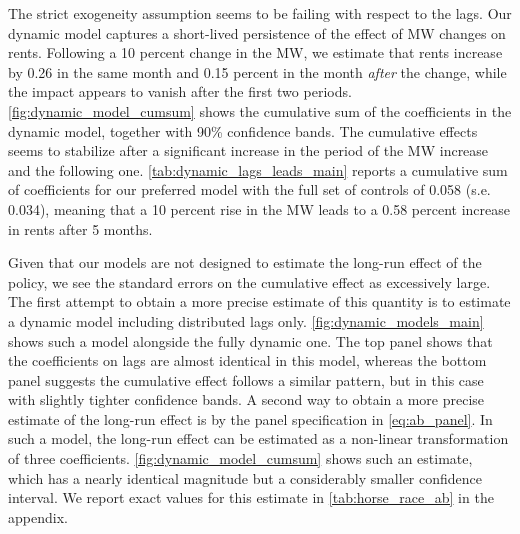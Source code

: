 The strict exogeneity assumption seems to be failing with respect to the lags. Our dynamic model 
captures a short-lived persistence of the effect of MW changes on rents. Following a 10 percent 
change in the MW, we estimate that rents increase by 0.26 in the same month and 0.15 percent in the 
month \textit{after} the change, while the impact appears to vanish after the first two periods. 
\autoref{fig:dynamic_model_cumsum} shows the cumulative sum of the coefficients in the dynamic model,
together with 90\% confidence bands. The cumulative effects seems to stabilize after a significant 
increase in the period of the MW increase and the following one. \autoref{tab:dynamic_lags_leads_main}
reports a cumulative sum of coefficients for our preferred model with the full set of controls 
of 0.058 (s.e. 0.034), meaning that a 10 percent rise in the MW leads to a 0.58 percent increase 
in rents after 5 months.

Given that our models are not designed to estimate the long-run effect of the policy, we see the
standard errors on the cumulative effect as excessively large. The first attempt to obtain a more
precise estimate of this quantity is to estimate a dynamic model including distributed lags only. 
\autoref{fig:dynamic_models_main} shows such a model alongside the fully dynamic one. The top panel 
shows that the coefficients on lags are almost identical in this model, whereas the bottom panel 
suggests the cumulative effect follows a similar pattern, but in this case with slightly tighter 
confidence bands. A second way to obtain a more precise estimate of the long-run effect is by the 
panel specification in \autoref{eq:ab_panel}. In such a model, the long-run effect can be estimated 
as a non-linear transformation of three coefficients. \autoref{fig:dynamic_model_cumsum} shows such 
an estimate, which has a nearly identical magnitude but a considerably smaller confidence interval.
We report exact values for this estimate in \autoref{tab:horse_race_ab} in the appendix.

